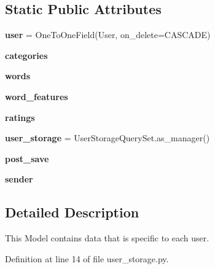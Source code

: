 \subsection*{Static Public Attributes}
\begin{DoxyCompactItemize}
\item 
\mbox{\label{classcapstoneproject_1_1models_1_1models_1_1user__storage_1_1_user_storage_a28af083de45df95cdfdd73d853ad1af8}} 
{\bfseries user} = One\+To\+One\+Field(User, on\+\_\+delete=C\+A\+S\+C\+A\+DE)
\item 
{\bfseries categories}
\item 
{\bfseries words}
\item 
{\bfseries word\+\_\+features}
\item 
{\bfseries ratings}
\item 
\mbox{\label{classcapstoneproject_1_1models_1_1models_1_1user__storage_1_1_user_storage_a52d6af55b4083df405389b9aa5acddca}} 
{\bfseries user\+\_\+storage} = User\+Storage\+Query\+Set.\+as\+\_\+manager()
\item 
\mbox{\label{classcapstoneproject_1_1models_1_1models_1_1user__storage_1_1_user_storage_a7851902ba5f507a22edf81bf694caf50}} 
{\bfseries post\+\_\+save}
\item 
\mbox{\label{classcapstoneproject_1_1models_1_1models_1_1user__storage_1_1_user_storage_a0e11e35e8a540590c33d877fe9e7a906}} 
{\bfseries sender}
\end{DoxyCompactItemize}


\subsection{Detailed Description}
\begin{DoxyVerb}This Model contains data that is specific to each user.
\end{DoxyVerb}
 

Definition at line 14 of file user\+\_\+storage.\+py.



